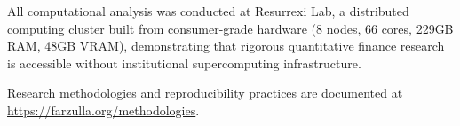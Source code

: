 \documentclass[11pt,twocolumn]{article}
\begin{document}
All computational analysis was conducted at Resurrexi Lab, a distributed computing cluster built from consumer-grade hardware (8 nodes, 66 cores, 229GB RAM, 48GB VRAM), demonstrating that rigorous quantitative finance research is accessible without institutional supercomputing infrastructure.

Research methodologies and reproducibility practices are documented at \url{https://farzulla.org/methodologies}.


\end{document}
